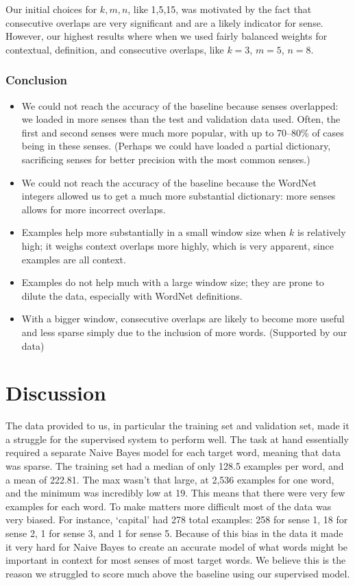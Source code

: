 \documentclass{article}
\begin{document}
Our initial choices for $k,m,n$, like 1,5,15, was motivated by the fact that consecutive overlaps are very significant and are a likely indicator for sense. However, our highest results where when we used fairly balanced weights for contextual, definition, and consecutive overlaps, like $k=3$, $m=5$, $n=8$.

\subsubsection{Conclusion}

\begin{itemize}
\item We could not reach the accuracy of the baseline because senses overlapped: we loaded in more senses than the test and validation data used. Often, the first and second senses were much more popular, with up to 70--80\% of cases being in these senses. (Perhaps we could have loaded a partial dictionary, sacrificing senses for better precision with the most common senses.)
\item We could not reach the accuracy of the baseline because the WordNet integers allowed us to get a much more substantial dictionary: more senses allows for more incorrect overlaps.
\item Examples help more substantially in a small window size when $k$ is relatively high; it weighs context overlaps more highly, which is very apparent, since examples are all context.
\item Examples do not help much with a large window size; they are prone to dilute the data, especially with WordNet definitions.
\item With a bigger window, consecutive overlaps are likely to become more useful and less sparse simply due to the inclusion of more words. (Supported by our data)
\end{itemize}

\section{Discussion}

The data provided to us, in particular the training set and validation set, made it a struggle for the supervised system to perform well. The task at hand essentially required a separate Naive Bayes model for each target word, meaning that data was sparse. The training set had a median of only 128.5 examples per word, and a mean of 222.81. The max wasn't that large, at 2,536 examples for one word, and the minimum was incredibly low at 19. This means that there were very few examples for each word. To make matters more difficult most of the data was very biased. For instance, `capital' had 278 total examples: 258 for sense 1, 18 for sense 2, 1 for sense 3, and 1 for sense 5. Because of this bias in the data it made it very hard for Naive Bayes to create an accurate model of what words might be important in context for most senses of most target words. We believe this is the reason we struggled to score much above the baseline using our supervised model. 
\end{document}
